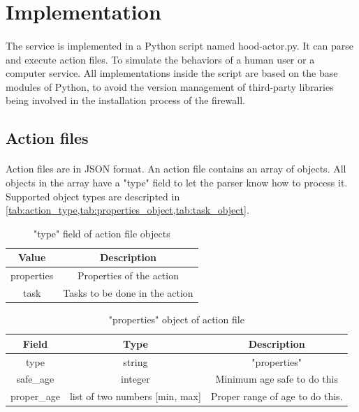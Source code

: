 \documentclass[mscthesis]{usiinfthesis}
\begin{document}
\section{Implementation}
\paragraph{}
The service is implemented in a Python script named hood-actor.py. It can parse and execute action files. To simulate the behaviors of a human user or a computer service. All implementations inside the script are based on the base modules of Python, to avoid the version management of third-party libraries being involved in the installation process of the firewall.

\subsection{Action files}
\paragraph{}
Action files are in JSON format. An action file contains an array of objects. All objects in the array have a "type" field to let the parser know how to process it. Supported object types are descripted in \cref{tab:action_type,tab:properties_object,tab:task_object}.

\begin{table}[H]
  \centering
  \begin{tabular}{|c|c|}
    \hline
    Value      & Description                    \\
    \hline
    properties & Properties of the action       \\
    task       & Tasks to be done in the action \\
    \hline
  \end{tabular}
  \caption{"type" field of action file objects}
  \label{tab:action_type}
\end{table}


\begin{table}[H]
  \centering
  \begin{tabular}{|c|c|c|}
    \hline
    Field       & Type                           & Description                     \\
    \hline
    type        & string                         & "properties"                    \\
    safe\_age   & integer                        & Minimum age safe to do this     \\
    proper\_age & list of two numbers [min, max] & Proper range of age to do this. \\
    \hline
  \end{tabular}
  \caption{"properties" object of action file}
  \label{tab:properties_object}
\end{table}
\end{document}
